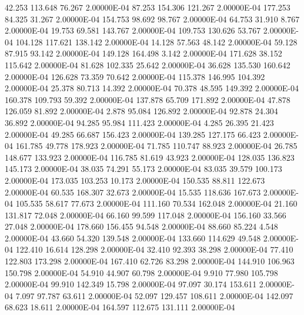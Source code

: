     42.253   113.648    76.267  2.00000E-04
    87.253   154.306   121.267  2.00000E-04
   177.253    84.325    31.267  2.00000E-04
   154.753    98.692    98.767  2.00000E-04
    64.753    31.910     8.767  2.00000E-04
    19.753    69.581   143.767  2.00000E-04
   109.753   130.626    53.767  2.00000E-04
   104.128   117.621   138.142  2.00000E-04
    14.128    57.563    48.142  2.00000E-04
    59.128    87.915    93.142  2.00000E-04
   149.128   164.498     3.142  2.00000E-04
   171.628    38.152   115.642  2.00000E-04
    81.628   102.335    25.642  2.00000E-04
    36.628   135.530   160.642  2.00000E-04
   126.628    73.359    70.642  2.00000E-04
   115.378   146.995   104.392  2.00000E-04
    25.378    80.713    14.392  2.00000E-04
    70.378    48.595   149.392  2.00000E-04
   160.378   109.793    59.392  2.00000E-04
   137.878    65.709   171.892  2.00000E-04
    47.878   126.059    81.892  2.00000E-04
     2.878    95.084   126.892  2.00000E-04
    92.878    24.304    36.892  2.00000E-04
    94.285    95.984   111.423  2.00000E-04
     4.285    26.395    21.423  2.00000E-04
    49.285    66.687   156.423  2.00000E-04
   139.285   127.175    66.423  2.00000E-04
   161.785    49.778   178.923  2.00000E-04
    71.785   110.747    88.923  2.00000E-04
    26.785   148.677   133.923  2.00000E-04
   116.785    81.619    43.923  2.00000E-04
   128.035   136.823   145.173  2.00000E-04
    38.035    74.291    55.173  2.00000E-04
    83.035    39.579   100.173  2.00000E-04
   173.035   103.253    10.173  2.00000E-04
   150.535    88.811   122.673  2.00000E-04
    60.535   168.307    32.673  2.00000E-04
    15.535   118.636   167.673  2.00000E-04
   105.535    58.617    77.673  2.00000E-04
   111.160    70.534   162.048  2.00000E-04
    21.160   131.817    72.048  2.00000E-04
    66.160    99.599   117.048  2.00000E-04
   156.160    33.566    27.048  2.00000E-04
   178.660   156.455    94.548  2.00000E-04
    88.660    85.224     4.548  2.00000E-04
    43.660    54.320   139.548  2.00000E-04
   133.660   114.629    49.548  2.00000E-04
   122.410    16.614   128.298  2.00000E-04
    32.410    92.393    38.298  2.00000E-04
    77.410   122.803   173.298  2.00000E-04
   167.410    62.726    83.298  2.00000E-04
   144.910   106.963   150.798  2.00000E-04
    54.910    44.907    60.798  2.00000E-04
     9.910    77.980   105.798  2.00000E-04
    99.910   142.349    15.798  2.00000E-04
    97.097    30.174   153.611  2.00000E-04
     7.097    97.787    63.611  2.00000E-04
    52.097   129.457   108.611  2.00000E-04
   142.097    68.623    18.611  2.00000E-04
   164.597   112.675   131.111  2.00000E-04
